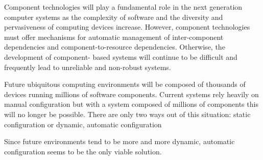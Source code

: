 Component technologies will play a fundamental role in the next generation
computer systems as the complexity of software and the diversity and
pervasiveness of computing devices increase. However, component technologies
must offer mechanisms for automatic management of inter-component dependencies
and component-to-resource dependencies. Otherwise, the development of
component- based systems will continue to be difficult and frequently lead to
unreliable and non-robust systems.  

Future ubiquitous computing environments will be composed of thousands of
devices running millions of software components. Current systems rely heavily
on manual configuration but with a system composed of millions of components
this will no longer be possible.  There are only two ways out of this
situation: static configuration or dynamic, automatic configuration

Since future environments tend to be more and more dynamic, automatic
configuration seems to be the only viable solution.
